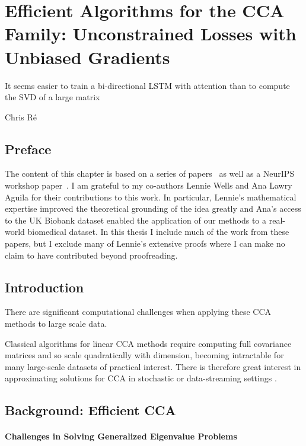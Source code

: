 \graphicspath{{chapters/gradient_descent/}}


\chapter{Efficient Algorithms for the CCA Family: Unconstrained Losses with Unbiased Gradients}\label{chap:gradient_descent}
\epigraph{It seems easier to train a bi-directional LSTM with attention than to compute the SVD of a large matrix}{Chris Ré}\cite{gemp2021}
\minitoc
\section*{Preface}
The content of this chapter is based on a series of papers~\citep{chapman2022generalized, chapman2023efficient} as well as a NeurIPS workshop paper~\citep{chapman2023neurips}.
I am grateful to my co-authors Lennie Wells and Ana Lawry Aguila for their contributions to this work.
In particular, Lennie's mathematical expertise improved the theoretical grounding of the idea greatly and Ana's access to the UK Biobank dataset enabled the application of our methods to a real-world biomedical dataset.
In this thesis I include much of the work from these papers, but I exclude many of Lennie's extensive proofs where I can make no claim to have contributed beyond proofreading.

\section{Introduction}

There are significant computational challenges when applying these CCA methods to large scale data.



Classical algorithms for linear CCA methods require computing full covariance matrices and so scale quadratically with dimension, becoming intractable for many large-scale datasets of practical interest.
There is therefore great interest in approximating solutions for CCA in stochastic or data-streaming settings \citep{arora2012stochastic}.




\section{Background: Efficient CCA}\label{sec:background-unified}

\subsubsection{Challenges in Solving Generalized Eigenvalue Problems}

